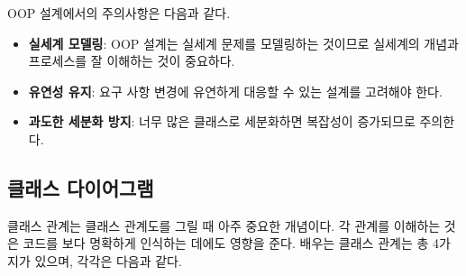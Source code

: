 OOP 설계에서의 주의사항은 다음과 같다.
\begin{itemize}
\item \textbf{실세계 모델링}: OOP 설계는 실세계 문제를 모델링하는 것이므로 실세계의 개념과 프로세스를 잘 이해하는 것이 중요하다.
\item \textbf{유연성 유지}: 요구 사항 변경에 유연하게 대응할 수 있는 설계를 고려해야 한다.
\item \textbf{과도한 세분화 방지}: 너무 많은 클래스로 세분화하면 복잡성이 증가되므로 주의한다.
\end{itemize}

\subsection{클래스 다이어그램}

클래스 관계는 클래스 관계도를 그릴 때 아주 중요한 개념이다. 각 관계를 이해하는 것은 코드를 보다 명확하게 인식하는 데에도 영향을 준다. 배우는 클래스 관계는 총 4가지가 있으며, 각각은 다음과 같다.
